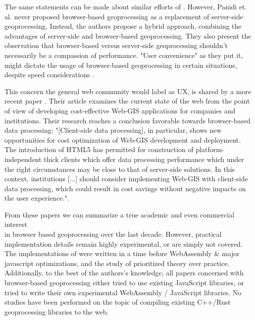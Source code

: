 The same statements can be made about similar efforts of \citet{panidi_hybrid_2015}. 
However, Panidi et. al. never proposed browser-based geoprocessing as a replacement of server-side geoprocessing. 
Instead, the authors propose a hybrid approach, combining the advantages of server-side and browser-based geoprocessing. 
They also present the observation that browser-based versus server-side geoprocessing shouldn't necessarily be a compassion of performance. 
"User convenience" as they put it, might dictate the usage of browser-based geoprocessing in certain situations, despite speed considerations \cite{panidi_hybrid_2015}. 

This concern the general web community would label as \ac{UX}, is shared by a more recent paper \cite{kulawiak_analysis_2019}. 
Their article examines the current state of the web from the point of view of developing cost-effective Web-GIS applications for companies and institutions. 
Their research reaches a conclusion favorable towards browser-based data processing: "[Client-side data processing], in particular, shows new opportunities for cost optimization of Web-GIS development and deployment. 
The introduction of HTML5 has permitted for construction of platform-independent thick clients which offer data processing performance which under the right circumstances may be close to that of server-side solutions. 
In this context, institutions [...] should consider implementing Web-GIS with client-side data processing, which could result in cost savings without negative impacts on the user experience.".


From these papers we can summarize a true academic and even commercial interest \\ in browser based geoprocessing over the last decade. 
However, practical implementation details remain highly experimental, or are simply not covered.  
The implementations of \cite{panidi_hybrid_2015, hamilton_client-side_2014} were written in a time before WebAssembly \& major javascript optimizations, and the study of \cite{kulawiak_analysis_2019} prioritized theory over practice. 
Additionally, to the best of the authors's knowledge, all papers concerned with browser-based geoprocessing either tried to use existing JavaScript libraries, or tried to write their own experimental WebAssembly / JavaScript libraries. 
No studies have been performed on the topic of compiling existing C++/Rust geoprocessing libraries to the web. 

